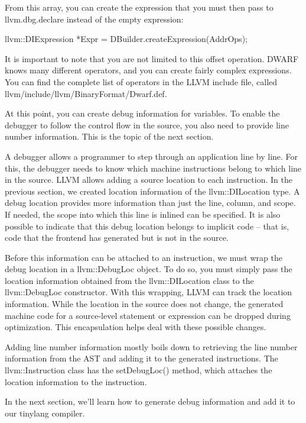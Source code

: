 From this array, you can create the expression that you must then pass to llvm.dbg.declare instead of the empty expression:

\begin{cpp}
llvm::DIExpression *Expr = DBuilder.createExpression(AddrOps);
\end{cpp}

It is important to note that you are not limited to this offset operation. DWARF knows many different operators, and you can create fairly complex expressions. You can find the complete list of operators in the LLVM include file, called llvm/include/llvm/BinaryFormat/Dwarf.def.

At this point, you can create debug information for variables. To enable the debugger to follow the control flow in the source, you also need to provide line number information. This is the topic of the next section.


A debugger allows a programmer to step through an application line by line. For this, the debugger needs to know which machine instructions belong to which line in the source. LLVM allows adding a source location to each instruction. In the previous section, we created location information of the llvm::DILocation type. A debug location provides more information than just the line, column, and scope. If needed, the scope into which this line is inlined can be specified. It is also possible to indicate that this debug location belongs to implicit code – that is, code that the frontend has generated but is not in the source.

Before this information can be attached to an instruction, we must wrap the debug location in a llvm::DebugLoc object. To do so, you must simply pass the location information obtained from the llvm::DILocation class to the llvm::DebugLoc constructor. With this wrapping, LLVM can track the location information. While the location in the source does not change, the generated machine code for a source-level statement or expression can be dropped during optimization. This encapsulation helps deal with these possible changes.

Adding line number information mostly boils down to retrieving the line number information from the AST and adding it to the generated instructions. The llvm::Instruction class has the setDebugLoc() method, which attaches the location information to the instruction.

In the next section, we’ll learn how to generate debug information and add it to our tinylang compiler.

